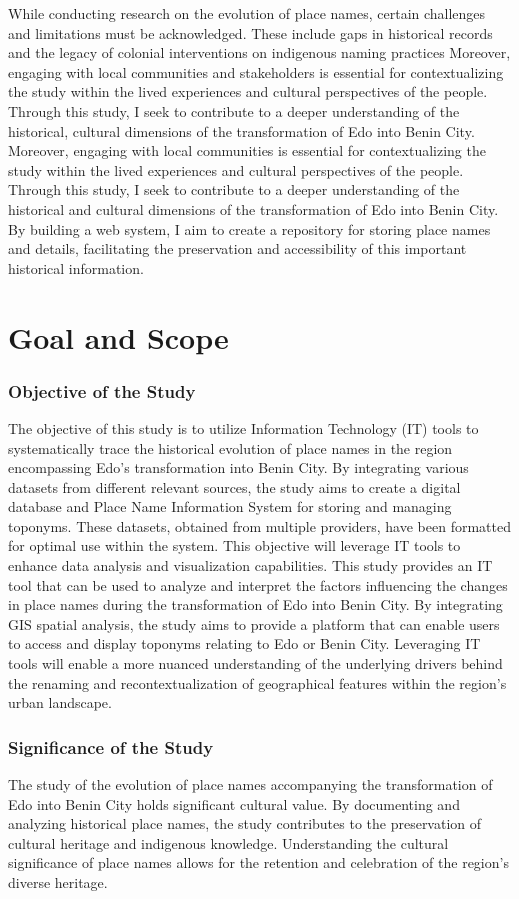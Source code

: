 While conducting research on the evolution of place names, certain challenges and limitations must be acknowledged. These include gaps in historical records and the legacy of colonial interventions on indigenous naming practices Moreover, engaging with local communities and stakeholders is essential for contextualizing the study within the lived experiences and cultural perspectives of the people. 
Through this study, I seek to contribute to a deeper understanding of the historical, cultural dimensions of the transformation of Edo into Benin City. Moreover, engaging with local communities is essential for contextualizing the study within the lived experiences and cultural perspectives of the people. Through this study, I seek to contribute to a deeper understanding of the historical and cultural dimensions of the transformation of Edo into Benin City. By building a web system, I aim to create a repository for storing place names and details, facilitating the preservation and accessibility of this important historical information.

\section{Goal and Scope}
\subsubsection{Objective of the Study}
The objective of this study is to utilize Information Technology (IT) tools to systematically trace the historical evolution of place names in the region encompassing Edo's transformation into Benin City. By integrating various datasets from different relevant sources, the study aims to create a digital database and Place Name Information System for storing and managing toponyms. These datasets, obtained from multiple providers, have been formatted for optimal use within the system. This objective will leverage IT tools to enhance data analysis and visualization capabilities.
This study provides an IT tool that can be used to analyze and interpret the factors influencing the changes in place names during the transformation of Edo into Benin City. By integrating GIS spatial analysis, the study aims to provide a platform that can enable users to access and display toponyms relating to Edo or Benin City. Leveraging IT tools will enable a more nuanced understanding of the underlying drivers behind the renaming and recontextualization of geographical features within the region's urban landscape.
\subsubsection{Significance of the Study}
The study of the evolution of place names accompanying the transformation of Edo into Benin City holds significant cultural value. By documenting and analyzing historical place names, the study contributes to the preservation of cultural heritage and indigenous knowledge. Understanding the cultural significance of place names allows for the retention and celebration of the region's diverse heritage. 

